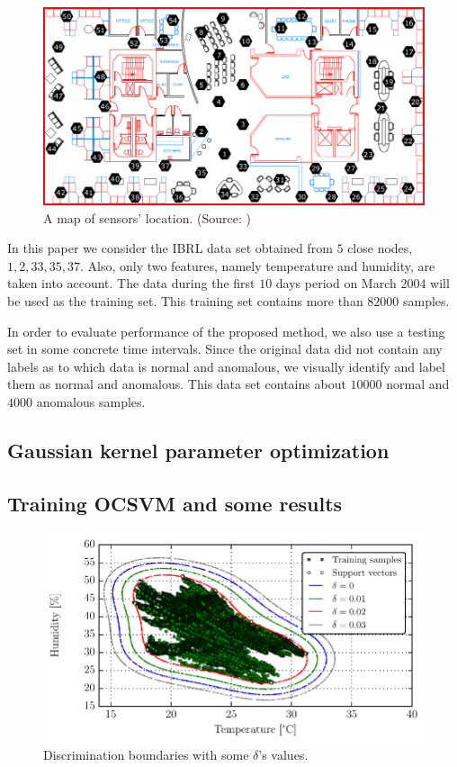 \documentclass[conference]{IEEEtran}
\theoremstyle{problemstyle}
\begin{document}
\begin{figure}[H]
\centering
\includegraphics[scale=.25]{Figs/ibrl_wsn.png}
\caption{A map of sensors' location. (Source: \cite{Buonadonna2005})}
\label{fig:sensor_map}
\end{figure}

In this paper we consider the IBRL data set obtained from $5$ close nodes, $1, 2, 33, 35, 37$. Also, only two features, namely temperature and humidity, are taken into account. The data during the first $10$ days period on March 2004 will be used as the training set. This training set contains more than $82000$ samples. 

In order to evaluate performance of the proposed method, we also use a testing set in some concrete time intervals. Since the original data did not contain any labels as to which data is normal and anomalous, we visually identify and label them as normal and anomalous. This data set contains about $10000$ normal and $4000$ anomalous samples.

\subsection{Gaussian kernel parameter optimization}

\subsection{Training OCSVM and some results}

\begin{figure}[H]
\centering
\includegraphics[scale=.6]{Python/data_description.pdf}
\caption{Discrimination boundaries with some $\delta$'s values. }
\label{fig:domain_boundary}
\end{figure}
\end{document}
